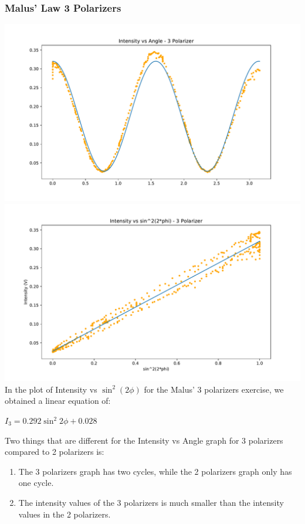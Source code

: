 \documentclass[a4paper, 11pt]{article}
\begin{document}
\subsubsection*{Malus' Law 3 Polarizers}
\includegraphics[width=\textwidth]{3pol-IntvsAng.pdf}
\includegraphics[width=\textwidth]{3pol-linear.pdf}
In the plot of Intensity vs $\sin^{2}(2\phi)$ for the Malus' 3 polarizers exercise, we obtained a linear equation of:
\begin{center}
$I_3 = 0.292\sin^{2}2\phi + 0.028$
\end{center} 

Two things that are different for the Intensity vs Angle graph for 3 polarizers compared to 2 polarizers is:
\begin{enumerate}
\item The 3 polarizers graph has two cycles, while the 2 polarizers graph only has one cycle.
\item The intensity values of the 3 polarizers is much smaller than the intensity values in the 2 polarizers.
\end{enumerate}
\end{document}
